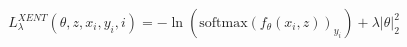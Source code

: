 \documentclass[preview]{standalone}
\begin{document}
\begin{align*}
L_{\lambda}^{XENT}(\theta, z, x_i, y_i, i) = - \ln(\text{softmax}(f_{\theta}(x_i, z))_{y_i}) + \lambda \left| \theta \right|_2^2
\end{align*}
\end{document}

